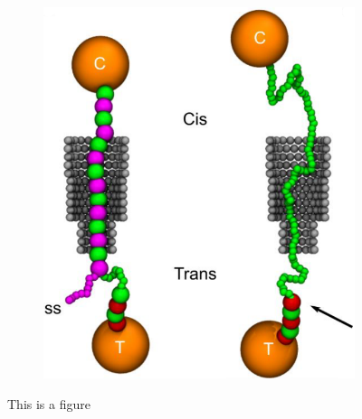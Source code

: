 \begin{figure}[ht]
\begin{centering}
\begin{subfigure}[t]{\dimexpr.5\linewidth-1.3em\relax}
  \includegraphics[width=.9\linewidth,valign=t]{Figures/Stefanos2.png}
  \end{subfigure}
  \caption{This is a figure}
  \label{fig:test}
  \end{centering}
\end{figure}
